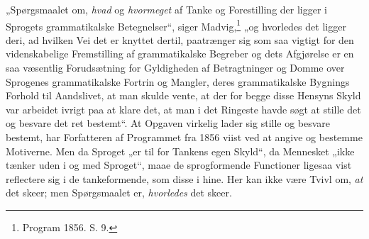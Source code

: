 \documentclass[12pt]{book}
\begin{document}
„Spørgsmaalet om, \emph{hvad} og \emph{hvormeget} af Tanke og
Forestilling der ligger i Sprogets grammatikalske Betegnelser“,
siger Madvig,\footnote{%
Program 1856. S. 9.} „og hvorledes det ligger deri, ad hvilken Vei
det er knyttet dertil, paatrænger sig som saa vigtigt for den
videnskabelige Fremstilling af grammatikalske Begreber og dets
Afgjørelse er en saa væsentlig Forudsætning for Gyldigheden af
Betragtninger og Domme over Sprogenes grammatikalske
Fortrin og Mangler, deres grammatikalske Bygnings Forhold til
Aandslivet, at man skulde vente, at der for begge disse Hensyns
Skyld var arbeidet ivrigt paa at klare det, at man i det Ringeste
havde søgt at stille det og besvare det ret bestemt“. At Opgaven
virkelig lader sig stille og besvare bestemt, har Forfatteren af
Programmet fra 1856 viist ved at angive og bestemme
Motiverne. Men da Sproget „er til for Tankens egen Skyld“,
da Mennesket „ikke tænker uden i og med Sproget“, maae de
sprogformende Functioner ligesaa vist reflectere sig i de
tankeformende, som disse i hine. Her kan ikke være Tvivl om,
\emph{at} det skeer; men Spørgsmaalet er, \emph{hvorledes} det skeer.
\end{document}
